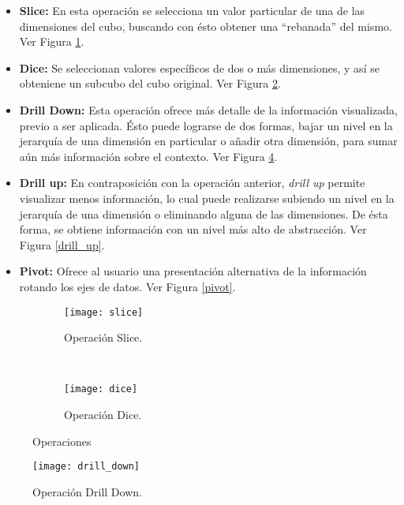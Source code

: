 \documentclass[a4paper,11pt]{article}
\begin{document}
    \begin{itemize}
      \item \textbf{Slice:} En esta operación se selecciona un valor particular de una de las dimensiones del cubo, buscando con ésto obtener una ``rebanada'' del
      mismo. Ver Figura \ref{slice}.
      \item \textbf{Dice:} Se seleccionan valores específicos de dos o más dimensiones, y así se obteniene un subcubo del cubo original. Ver Figura \ref{dice}.
      \item \textbf{Drill Down:} Esta operación ofrece más detalle de la información visualizada, previo a ser aplicada. Ésto puede
      lograrse de dos formas, bajar un nivel en la jerarquía de una dimensión en particular o añadir otra dimensión, para sumar aún más información sobre el contexto.
      Ver Figura \ref{drill_down}.
      \item \textbf{Drill up:} En contraposición con la operación anterior, \textit{drill up} permite visualizar menos información, lo cual puede realizarse
      subiendo un nivel en la jerarquía de una dimensión o eliminando alguna de las dimensiones. De ésta forma, se obtiene información con un nivel más alto
      de abstracción. Ver Figura \ref{drill_up}.
      \item \textbf{Pivot:} Ofrece al usuario una presentación alternativa de la información rotando los ejes de datos. Ver Figura \ref{pivot}.
    \end{itemize}
    
    \begin{figure}
        \centering
        \begin{subfigure}[b]{0.5\textwidth}
          \texttt{[image: slice]}
          \caption{Operación Slice. \cite{operaciones}}
          \label{slice}      
        \end{subfigure}%
        ~
        \begin{subfigure}[b]{0.5\textwidth}
          \texttt{[image: dice]}
          \caption{Operación Dice. \cite{operaciones}}
          \label{dice}
        \end{subfigure}
    \caption{
    \label{slice-dice}%
    Operaciones}
    \end{figure}
      
    \begin{figure}
      \begin{center}
        \texttt{[image: drill\_down]}
        \caption{Operación Drill Down. \cite{operaciones}}
        \label{drill_down}
      \end{center}
    \end{figure}
    
\end{document}
